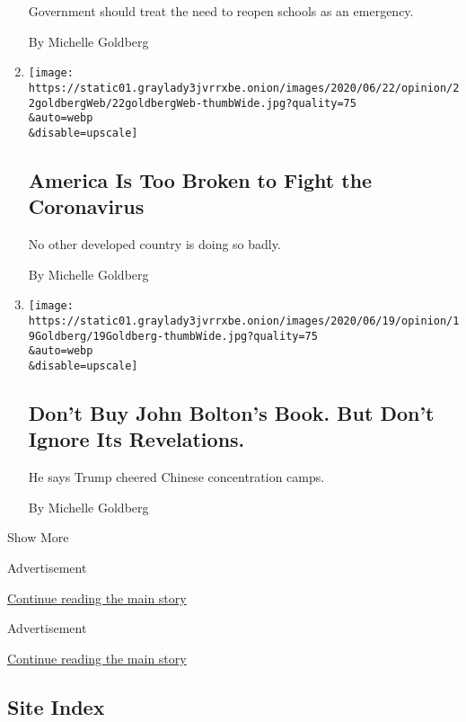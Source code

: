 \begin{enumerate}
  Government should treat the need to reopen schools as an emergency.

  By Michelle Goldberg
\item
  \href{/2020/06/22/opinion/us-coronavirus-trump.html}{}

  \texttt{[image: https://static01.graylady3jvrrxbe.onion/images/2020/06/22/opinion/22goldbergWeb/22goldbergWeb-thumbWide.jpg?quality=75\\\&auto=webp\\\&disable=upscale]}

  \hypertarget{america-is-too-broken-to-fight-the-coronavirus}{%
  \subsection{America Is Too Broken to Fight the
  Coronavirus}\label{america-is-too-broken-to-fight-the-coronavirus}}

  No other developed country is doing so badly.

  By Michelle Goldberg
\item
  \href{/2020/06/19/opinion/trump-john-bolton-book.html}{}

  \texttt{[image: https://static01.graylady3jvrrxbe.onion/images/2020/06/19/opinion/19Goldberg/19Goldberg-thumbWide.jpg?quality=75\\\&auto=webp\\\&disable=upscale]}

  \hypertarget{dont-buy-john-boltons-book-but-dont-ignore-its-revelations}{%
  \subsection{Don't Buy John Bolton's Book. But Don't Ignore Its
  Revelations.}\label{dont-buy-john-boltons-book-but-dont-ignore-its-revelations}}

  He says Trump cheered Chinese concentration camps.

  By Michelle Goldberg
\end{enumerate}

Show More

Advertisement

\protect\hyperlink{after-mid1}{Continue reading the main story}

Advertisement

\protect\hyperlink{after-mktg}{Continue reading the main story}

\hypertarget{site-index}{%
\subsection{Site Index}\label{site-index}}

